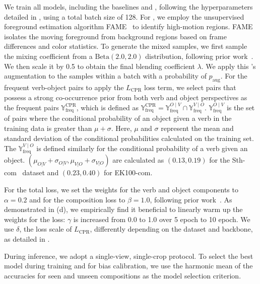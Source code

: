 We train all models, including the baselines and \ours{}, following the hyperparameters detailed in , using a total batch size of 128.
For \cpr{}, we employ the unsupervised foreground estimation algorithm FAME~\cite{ding2022fame} to identify high-motion regions. 
FAME~\cite{ding2022fame} isolates the moving foreground from background regions based on frame differences and color statistics. 
To generate the mixed samples, we first sample the mixing coefficient from a $\text{Beta}(2.0, 2.0)$ distribution, following prior work~\cite{yun2019cutmix, zhang2018mixup}.
We then scale it by 0.5 to obtain the final blending coefficient $\lambda$.
We apply this \cpr{}'s augmentation to the samples within a batch with a probability of $p_{\text{aug}}$.
For the frequent verb-object pairs to apply the $L_\text{CPR}$ loss term, we select pairs that possess a strong co-occurrence prior from both verb and object perspectives as the frequent pairs $\mathbb{Y}_\text{freq}^\text{CPR}$, which is defined as $\mathbb{Y}_\text{freq}^\text{CPR} = \mathbb{Y}_\text{freq}^{O \mid V} \cap \mathbb{Y}_\text{freq}^{V \mid O}$.
$\mathbb{Y}_\text{freq}^{O \mid V}$ is the set of pairs where the conditional probability of an object given a verb in the training data is greater than $\mu + \sigma$. 
Here, $\mu$ and $\sigma$ represent the mean and standard deviation of the conditional probabilities calculated on the training set. 
The $\mathbb{Y}_\text{freq}^{V \mid O}$ is defined similarly for the conditional probability of a verb given an object.
$(\mu_{O|V} + \sigma_{O|V}, \mu_{V|O} + \sigma_{V|O})$ are calculated as $(0.13, 0.19)$ for the Sth-com~\cite{li2024c2c} dataset and $(0.23, 0.40)$ for EK100-com.


For the total loss, we set the weights for the verb and object components to $\alpha = 0.2$ and for the composition loss to $\beta = 1.0$, following prior work~\cite{li2024c2c}. 
As demonstrated in  (d), we empirically find it beneficial to linearly warm up the weights for the \torc{} loss: $\gamma$ is increased from 0.0 to 1.0 over 5 epoch to 10 epoch.
We use $\delta$, the loss scale of $L_\text{CPR}$, differently depending on the dataset and backbone, as detailed in .

During inference, we adopt a single-view, single-crop protocol. 
To select the best model during training and for bias calibration, we use the harmonic mean of the accuracies for seen and unseen compositions as the model selection criterion.



